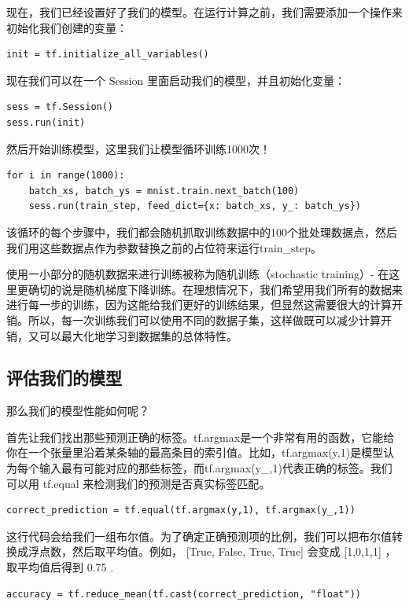 现在，我们已经设置好了我们的模型。在运行计算之前，我们需要添加一个操作来初始化我们创建的变量：

\begin{lstlisting}
init = tf.initialize_all_variables()
\end{lstlisting}

现在我们可以在一个 Session 里面启动我们的模型，并且初始化变量：
\begin{lstlisting}
sess = tf.Session()
sess.run(init)
\end{lstlisting}

然后开始训练模型，这里我们让模型循环训练1000次！
\begin{lstlisting}
for i in range(1000):
    batch_xs, batch_ys = mnist.train.next_batch(100)
    sess.run(train_step, feed_dict={x: batch_xs, y_: batch_ys})
\end{lstlisting}

该循环的每个步骤中，我们都会随机抓取训练数据中的100个批处理数据点，然后我们用这些数据点作为参数替换之前的占位符来运行train\_step。

使用一小部分的随机数据来进行训练被称为随机训练（stochastic training）- 在这里更确切的说是随机梯度下降训练。在理想情况下，我们希望用我们所有的数据来进行每一步的训练，因为这能给我们更好的训练结果，但显然这需要很大的计算开销。所以，每一次训练我们可以使用不同的数据子集，这样做既可以减少计算开销，又可以最大化地学习到数据集的总体特性。

\subsection{评估我们的模型}

那么我们的模型性能如何呢？

首先让我们找出那些预测正确的标签。tf.argmax是一个非常有用的函数，它能给你在一个张量里沿着某条轴的最高条目的索引值。比如，tf.argmax(y,1)是模型认为每个输入最有可能对应的那些标签，而tf.argmax(y\_,1)代表正确的标签。我们可以用 tf.equal 来检测我们的预测是否真实标签匹配。

\begin{lstlisting}
correct_prediction = tf.equal(tf.argmax(y,1), tf.argmax(y_,1))
\end{lstlisting}

这行代码会给我们一组布尔值。为了确定正确预测项的比例，我们可以把布尔值转换成浮点数，然后取平均值。例如， [True, False, True, True] 会变成 [1,0,1,1] ，取平均值后得到 0.75 .

\begin{lstlisting}
accuracy = tf.reduce_mean(tf.cast(correct_prediction, "float"))
\end{lstlisting}

